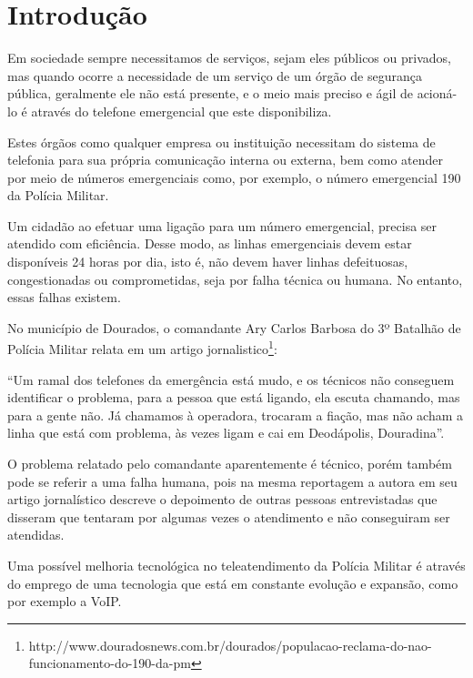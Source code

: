 
\chapter{Introdução}%
Em sociedade sempre necessitamos de serviços, sejam eles públicos ou privados, mas quando ocorre a necessidade de um serviço de um órgão de segurança pública, geralmente ele não está presente, e o meio mais preciso e ágil de acioná-lo é através do telefone emergencial que este disponibiliza.

Estes órgãos como qualquer empresa ou instituição necessitam do sistema de telefonia para sua própria comunicação interna ou externa, bem como atender por meio de números emergenciais como, por exemplo, o número emergencial 190 da Polícia Militar.

Um cidadão ao efetuar uma ligação para um número emergencial, precisa ser atendido com eficiência. Desse modo, as linhas emergenciais devem estar disponíveis 24 horas por dia, isto é, não devem haver linhas defeituosas, congestionadas ou comprometidas, seja por falha técnica ou humana. No entanto, essas falhas existem.

No município de Dourados, o comandante Ary Carlos Barbosa do 3º Batalhão de Polícia Militar relata em um artigo jornalistico\footnote{http://www.douradosnews.com.br/dourados/populacao-reclama-do-nao-funcionamento-do-190-da-pm}:

\begin{citacao}
``Um ramal dos telefones da emergência está mudo, e os técnicos não conseguem identificar o problema, para a pessoa que está ligando, ela escuta chamando, mas para a gente não. Já chamamos à operadora, trocaram a fiação, mas não acham a linha que está com problema, às vezes ligam e cai em Deodápolis, Douradina''.
\end{citacao}

O problema relatado pelo comandante aparentemente é técnico, porém também pode se referir a uma falha humana, pois na mesma reportagem a autora  em seu artigo jornalístico descreve o depoimento de outras pessoas entrevistadas que disseram que tentaram por algumas vezes o atendimento e não conseguiram ser atendidas.

Uma possível melhoria tecnológica no teleatendimento da Polícia Militar é através do emprego de uma tecnologia que está em constante evolução e expansão, como por exemplo a VoIP. 

